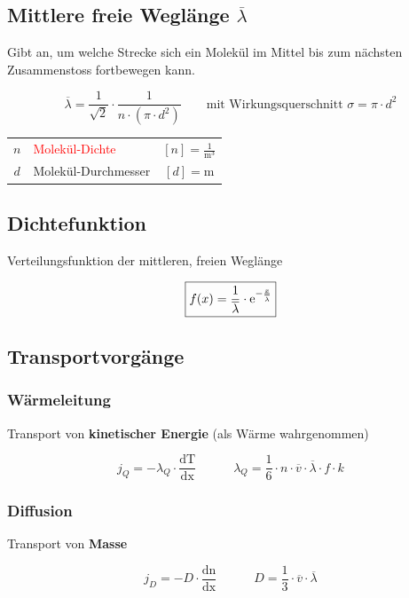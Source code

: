 \subsection{Mittlere freie Weglänge $\overline{\lambda}$}

Gibt an, um welche Strecke sich ein Molekül im Mittel bis zum nächsten Zusammenstoss fortbewegen kann.

$$ \boxed{ \overline{\lambda} = \frac{1}{\sqrt{2}} \cdot \frac{1}{n \cdot (\pi \cdot d^2 )} }  \qquad \text{mit Wirkungsquerschnitt } \sigma = \pi \cdot d^2$$

\begin{tabular}{c l c}
	\rule{0pt}{8pt}$n$ & \textcolor{red}{Molekül-Dichte} & $[n] = \mathrm{\frac{1}{m^3}}$\\	
	$d$ & Molekül-Durchmesser & $[d] = \mathrm{m}$ \\
\end{tabular}




\subsection{Dichtefunktion}
Verteilungsfunktion der mittleren, freien Weglänge 

$$ \boxed{ f(x) = \frac{1}{\overline{\lambda}} \cdot \mathrm{e}^{- \frac{x}{\overline{\lambda}}}  } $$


\subsection{Transportvorgänge}

\subsubsection{Wärmeleitung}
Transport von \textbf{kinetischer Energie} (als Wärme wahrgenommen)

$$ \boxed{ j_Q = - \lambda_Q \cdot \frac{\mathrm{dT}}{\mathrm{dx}} \qquad \quad \lambda_Q = \frac{1}{6} \cdot n \cdot \overline{v} \cdot \overline{\lambda} \cdot f \cdot k }  $$




\subsubsection{Diffusion}
Transport von \textbf{Masse} 


$$ \boxed{ j_D = -D \cdot \frac{\mathrm{dn}}{\mathrm{dx}} \qquad \quad  D = \frac{1}{3} \cdot \overline{v} \cdot \overline{\lambda} }  $$



